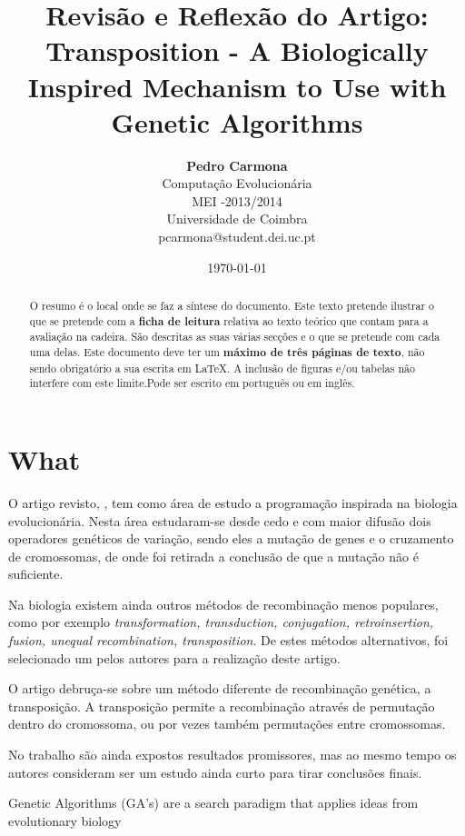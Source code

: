\documentclass[12pt,portuguese,a4paper]{article}
\title{\LARGE{\textbf{Revisão e Reflexão do Artigo:}}\\ Transposition - A Biologically Inspired Mechanism to Use with Genetic Algorithms \cite{Simoes99transposition:a}}
\author{ \textbf{Pedro Carmona} \\ Computação Evolucionária\\ MEI -2013/2014 \\ Universidade de Coimbra \\ pcarmona@student.dei.uc.pt}
\date{\today}
\begin{document}
\maketitle

\begin{abstract}

O resumo é o local onde se faz a síntese do documento.
Este texto pretende ilustrar o que se pretende com a \textbf{ficha de leitura} relativa ao texto teórico que contam para a avaliação na cadeira. São descritas as suas várias secções e o que se pretende com cada uma delas.  Este documento deve ter um \textbf{máximo de três páginas de texto}, não sendo obrigatório a sua escrita em \LaTeX{}. A inclusão de figuras e/ou tabelas não  interfere com este limite.Pode ser escrito em português ou em inglês.
\end{abstract}

\section{What}


O artigo revisto, \cite{Simoes99transposition:a}, tem como área de estudo a programação inspirada na biologia evolucionária.
Nesta área estudaram-se desde cedo e com maior difusão dois operadores genéticos de variação, sendo eles a mutação de genes e o cruzamento de cromossomas, de onde foi retirada a conclusão de que a mutação não é suficiente.

Na biologia existem ainda outros métodos de recombinação menos populares, como por exemplo \textit{transformation, transduction, conjugation, retroinsertion, fusion, unequal recombination, transposition}\cite{Simoes99transposition:a}. De estes métodos alternativos, foi selecionado um pelos autores para a realização deste artigo.

O artigo debruça-se sobre um método diferente de recombinação genética, a transposição.
A transposição permite a recombinação através de permutação dentro do cromossoma, ou por vezes também permutações entre cromossomas.

No trabalho \cite{Simoes99transposition:a} são ainda expostos resultados promissores, mas ao mesmo tempo os autores consideram ser um estudo ainda curto para tirar conclusões finais.


Genetic Algorithms (GA's) are a search paradigm that applies ideas from evolutionary biology
\end{document}

